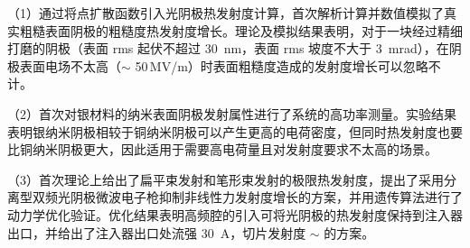 （1）通过将点扩散函数引入光阴极热发射度计算，首次解析计算并数值模拟了真实粗糙表面阴极的粗糙度热发射度增长。理论及模拟结果表明，对于一块经过精细打磨的阴极（表面 rms 起伏不超过 \SI{30}{nm}，表面 rms 坡度不大于 \SI{3}{mrad}），在阴极表面电场不太高（$\sim$ 50\,MV/m）时表面粗糙度造成的发射度增长可以忽略不计。

（2）首次对银材料的纳米表面阴极发射属性进行了系统的高功率测量。实验结果表明银纳米阴极相较于铜纳米阴极可以产生更高的电荷密度，但同时热发射度也要比铜纳米阴极更大，因此适用于需要高电荷量且对发射度要求不太高的场景。

（3）首次理论上给出了扁平束发射和笔形束发射的极限热发射度，提出了采用分离型双频光阴极微波电子枪抑制非线性力发射度增长的方案，并用遗传算法进行了动力学优化验证。优化结果表明高频腔的引入可将光阴极的热发射度保持到注入器出口，并给出了注入器出口处流强 \SI{30}{A}，切片发射度 $\sim$  的方案。
